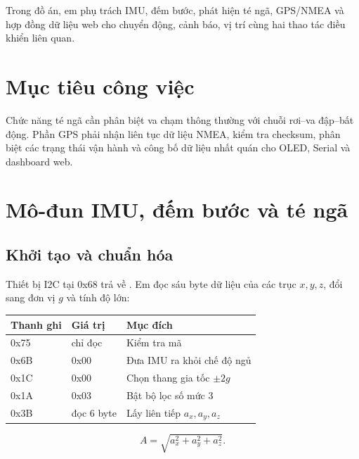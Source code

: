 \documentclass[12pt]{article}
\begin{document}

\begin{summarybox}
Trong đồ án, em phụ trách IMU, đếm bước, phát hiện té ngã, GPS/NMEA và hợp đồng dữ liệu web cho chuyển động, cảnh báo, vị trí cùng hai thao tác điều khiển liên quan.
\end{summarybox}

\section{Mục tiêu công việc}

Chức năng té ngã cần phân biệt va chạm thông thường với chuỗi rơi--va đập--bất động. Phần GPS phải nhận liên tục dữ liệu NMEA, kiểm tra checksum, phân biệt các trạng thái vận hành và công bố dữ liệu nhất quán cho OLED, Serial và dashboard web.

\section{Mô-đun IMU, đếm bước và té ngã}

\subsection{Khởi tạo và chuẩn hóa}

Thiết bị I2C tại 0x68 trả về . Em đọc sáu byte dữ liệu của các trục $x,y,z$, đổi sang đơn vị $g$ và tính độ lớn:

\begin{center}
\small
\begin{tabularx}{0.90\textwidth}{C{2.1cm} C{2.0cm} Y}
\toprule
\textbf{Thanh ghi} & \textbf{Giá trị} & \textbf{Mục đích}\\
\midrule
0x75 & chỉ đọc & Kiểm tra mã \\
0x6B & 0x00 & Đưa IMU ra khỏi chế độ ngủ\\
0x1C & 0x00 & Chọn thang gia tốc $\pm 2g$\\
0x1A & 0x03 & Bật bộ lọc số mức 3\\
0x3B & đọc 6 byte & Lấy liên tiếp $a_x,a_y,a_z$\\
\bottomrule
\end{tabularx}
\normalsize
\end{center}

\[
 A=\sqrt{a_x^2+a_y^2+a_z^2}.
\]
\end{document}
